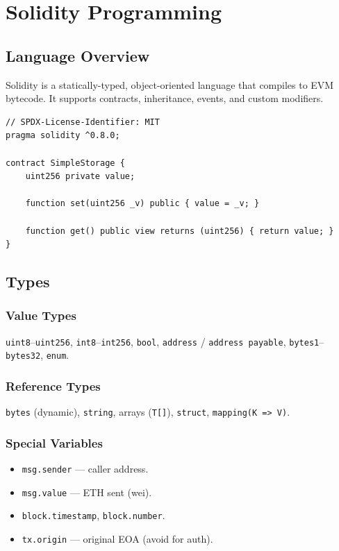 \documentclass[12pt,a4paper,openany]{book}
\theoremstyle{definition}
\theoremstyle{plain}
\theoremstyle{remark}
\begin{document}
\chapter{Solidity Programming}
\label{chap:solidity}

\section{Language Overview}

Solidity is a statically-typed, object-oriented language that compiles
to EVM bytecode.  It supports contracts, inheritance, events, and
custom modifiers.

\begin{lstlisting}[language=Solidity,caption=Minimal contract]
// SPDX-License-Identifier: MIT
pragma solidity ^0.8.0;

contract SimpleStorage {
    uint256 private value;

    function set(uint256 _v) public { value = _v; }

    function get() public view returns (uint256) { return value; }
}
\end{lstlisting}

\section{Types}

\subsection{Value Types}
\texttt{uint8}--\texttt{uint256}, \texttt{int8}--\texttt{int256},
\texttt{bool}, \texttt{address} / \texttt{address payable},
\texttt{bytes1}--\texttt{bytes32}, \texttt{enum}.

\subsection{Reference Types}
\texttt{bytes} (dynamic), \texttt{string}, arrays (\texttt{T[]}),
\texttt{struct}, \texttt{mapping(K => V)}.

\subsection{Special Variables}
\begin{itemize}
  \item \texttt{msg.sender} — caller address.
  \item \texttt{msg.value} — ETH sent (wei).
  \item \texttt{block.timestamp}, \texttt{block.number}.
  \item \texttt{tx.origin} — original EOA (avoid for auth).
\end{itemize}
\end{document}
